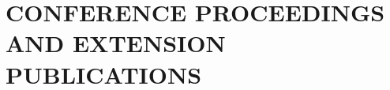 \documentclass[11pt]{article}
\begin{document}
%
%

\newpage
\section*{CONFERENCE PROCEEDINGS AND EXTENSION PUBLICATIONS}
\end{document}
